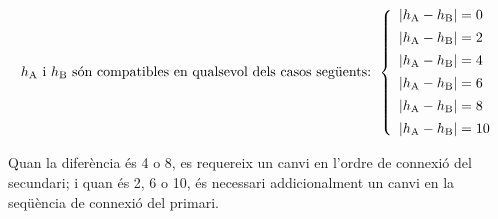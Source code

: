 \begin{equation}
    h_\mathrm{A} \text{ i } h_\mathrm{B} \text{ són compatibles en qualsevol dels casos següents: }
    \left\{
        \begin{array}{l}
           |h_\mathrm{A} - h_\mathrm{B}| = 0 \\[1ex]
           |h_\mathrm{A} - h_\mathrm{B}| = 2 \\[1ex]
           |h_\mathrm{A} - h_\mathrm{B}| = 4 \\[1ex]
           |h_\mathrm{A} - h_\mathrm{B}| = 6 \\[1ex]
           |h_\mathrm{A} - h_\mathrm{B}| = 8 \\[1ex]
           |h_\mathrm{A} - h_\mathrm{B}| = 10
        \end{array}
    \right.
    \label{eq:index_comp}
\end{equation}

Quan la diferència és 4 o 8, es requereix un canvi en l'ordre de connexió del secundari; i quan és 2, 6 o 10, és necessari addicionalment un canvi en la seqüència de connexió del primari.
	
